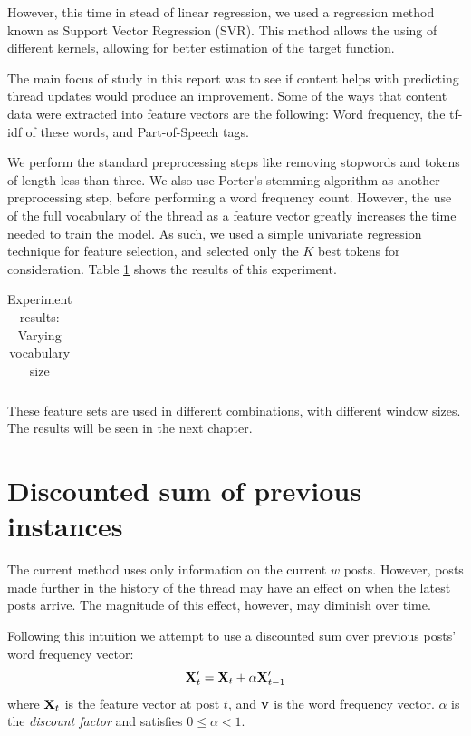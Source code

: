 However, this time in stead of linear regression, we used a regression method 
known as Support Vector Regression (SVR). This method allows the using of 
different kernels, allowing for better estimation of the target function.

The main focus of study in this report was to see if content helps with 
predicting thread updates would produce an improvement. Some of the ways that 
content data were extracted into feature vectors are the following: Word 
frequency, the tf-idf of these words, and Part-of-Speech tags.

We perform the standard preprocessing steps like removing stopwords and tokens 
of length less than three. We also use Porter's stemming algorithm as another 
preprocessing step, before performing a word frequency count. However, the use 
of the full vocabulary of the thread as a feature vector greatly increases the 
time needed to train the model. As such, we used a simple univariate regression 
technique for feature selection, and selected only the $K$ best tokens for 
consideration. Table \ref{table:vocab_exp} shows the results of this experiment.  

\begin{table}
	\footnotesize
	\begin{centering}
	\begin{tabular}{|l|c|c|c|c|c|c|c|c|}
	\hline
	
	\hline
	\end{tabular}
	\caption{Experiment results: Varying vocabulary size}
	\label{table:vocab_exp}
\end{centering}
\end{table}


These feature sets are used in different combinations, with different window 
sizes. The results will be seen in the next chapter.

\section{Discounted sum of previous instances}
The current method uses only information on the current $w$ posts. However, 
posts made further in the history of the thread may have an effect on when the 
latest posts arrive. The magnitude of this effect, however, may diminish over 
time.

Following this intuition we attempt to use a discounted sum over previous posts' 
word frequency vector:
\[
	\mathbf{X}'_t = \mathbf{X}_t + \alpha \mathbf{X}'_{t-1}
\]
where $\mathbf{X}_t$ is the feature vector at post $t$, and $\mathbf{v}$ is the word 
frequency vector. $\alpha$ is the \emph{discount factor} and satisfies $0 \leq 
\alpha < 1$.

